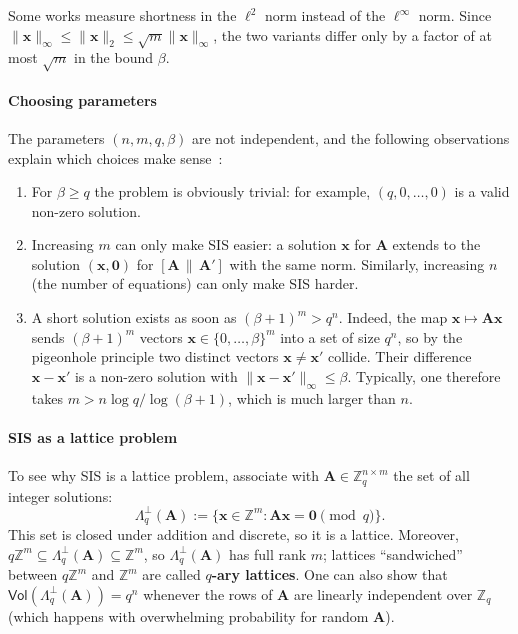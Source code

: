 \documentclass[../../book.tex]{subfiles}
\begin{document}
\begin{remark}
    Some works measure shortness in the $\ell^2$ norm instead of the $\ell^{\infty}$ norm.
    Since $\|\mathbf{x}\|_{\infty} \leq \|\mathbf{x}\|_2 \leq \sqrt{m}\|\mathbf{x}\|_{\infty}$, the two variants differ only by a factor of at most $\sqrt{m}$ in the bound $\beta$.
\end{remark}

\paragraph{Choosing parameters}
The parameters $(n,m,q,\beta)$ are not independent, and the following observations explain which choices make sense~\cite{EPRINT:Peikert15}:
\begin{enumerate}
    \item[\textit{(i)}] For $\beta \geq q$ the problem is obviously trivial: for example, $(q,0,\dots,0)$ is a valid non-zero solution.
    \item[\textit{(ii)}] Increasing $m$ can only make SIS easier: a solution $\mathbf{x}$ for $\mathbf{A}$ extends to the solution $(\mathbf{x},\mathbf{0})$ for $[\mathbf{A}\,\|\,\mathbf{A}']$ with the same norm.
    Similarly, increasing $n$ (the number of equations) can only make SIS harder.
    \item[\textit{(iii)}] A short solution exists as soon as $(\beta+1)^m > q^n$.
    Indeed, the map $\mathbf{x} \mapsto \mathbf{A}\mathbf{x}$ sends $(\beta+1)^m$ vectors $\mathbf{x} \in \{0,\dots,\beta\}^m$ into a set of size $q^n$, so by the pigeonhole principle two distinct vectors $\mathbf{x} \neq \mathbf{x}'$ collide.
    Their difference $\mathbf{x}-\mathbf{x}'$ is a non-zero solution with $\|\mathbf{x}-\mathbf{x}'\|_{\infty} \leq \beta$.
    Typically, one therefore takes $m > n\log q/\log(\beta+1)$, which is much larger than $n$.
\end{enumerate}

\paragraph{SIS as a lattice problem}
To see why SIS is a lattice problem, associate with $\mathbf{A} \in \mathbb{Z}_q^{n \times m}$ the set of all integer solutions:
\begin{equation*}
    \Lambda^{\perp}_q(\mathbf{A}) := \{\mathbf{x} \in \mathbb{Z}^m: \mathbf{A}\mathbf{x} = \mathbf{0} \pmod{q}\}.
\end{equation*}
This set is closed under addition and discrete, so it is a lattice.
Moreover, $q\mathbb{Z}^m \subseteq \Lambda^{\perp}_q(\mathbf{A}) \subseteq \mathbb{Z}^m$, so $\Lambda^{\perp}_q(\mathbf{A})$ has full rank $m$; lattices ``sandwiched'' between $q\mathbb{Z}^m$ and $\mathbb{Z}^m$ are called \textbf{$q$-ary lattices}.
One can also show that $\mathsf{Vol}(\Lambda^{\perp}_q(\mathbf{A})) = q^n$ whenever the rows of $\mathbf{A}$ are linearly independent over $\mathbb{Z}_q$ (which happens with overwhelming probability for random $\mathbf{A}$).
\end{document}
